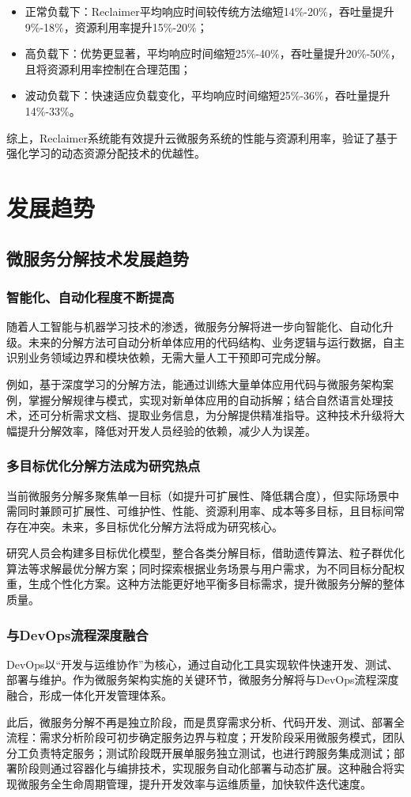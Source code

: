 \documentclass[lang=cn,11pt,a4paper,cite=number]{elegantpaper}
\begin{document}
\begin{itemize}
  \item 正常负载下：Reclaimer平均响应时间较传统方法缩短14\%-20\%，吞吐量提升9\%-18\%，资源利用率提升15\%-20\%；
  \item 高负载下：优势更显著，平均响应时间缩短25\%-40\%，吞吐量提升20\%-50\%，且将资源利用率控制在合理范围；
  \item 波动负载下：快速适应负载变化，平均响应时间缩短25\%-36\%，吞吐量提升14\%-33\%。
\end{itemize}

综上，Reclaimer系统能有效提升云微服务系统的性能与资源利用率，验证了基于强化学习的动态资源分配技术的优越性。

\section{发展趋势}
\subsection{微服务分解技术发展趋势}
\subsubsection{智能化、自动化程度不断提高}
\label{sec:x1}
随着人工智能与机器学习技术的渗透，微服务分解将进一步向智能化、自动化升级。未来的分解方法可自动分析单体应用的代码结构、业务逻辑与运行数据，自主识别业务领域边界和模块依赖，无需大量人工干预即可完成分解。\par
例如，基于深度学习的分解方法，能通过训练大量单体应用代码与微服务架构案例，掌握分解规律与模式，实现对新单体应用的自动拆解；结合自然语言处理技术，还可分析需求文档、提取业务信息，为分解提供精准指导。这种技术升级将大幅提升分解效率，降低对开发人员经验的依赖，减少人为误差。
\subsubsection{多目标优化分解方法成为研究热点}
\label{sec:x1}
当前微服务分解多聚焦单一目标（如提升可扩展性、降低耦合度），但实际场景中需同时兼顾可扩展性、可维护性、性能、资源利用率、成本等多目标，且目标间常存在冲突。未来，多目标优化分解方法将成为研究核心。\par
研究人员会构建多目标优化模型，整合各类分解目标，借助遗传算法、粒子群优化算法等求解最优分解方案；同时探索根据业务场景与用户需求，为不同目标分配权重，生成个性化方案。这种方法能更好地平衡多目标需求，提升微服务分解的整体质量。
\subsubsection{与DevOps流程深度融合}
\label{sec:x1}
DevOps以“开发与运维协作”为核心，通过自动化工具实现软件快速开发、测试、部署与维护。作为微服务架构实施的关键环节，微服务分解将与DevOps流程深度融合，形成一体化开发管理体系。\par
此后，微服务分解不再是独立阶段，而是贯穿需求分析、代码开发、测试、部署全流程：需求分析阶段可初步确定服务边界与粒度；开发阶段采用微服务模式，团队分工负责特定服务；测试阶段既开展单服务独立测试，也进行跨服务集成测试；部署阶段则通过容器化与编排技术，实现服务自动化部署与动态扩展。这种融合将实现微服务全生命周期管理，提升开发效率与运维质量，加快软件迭代速度。
\end{document}
